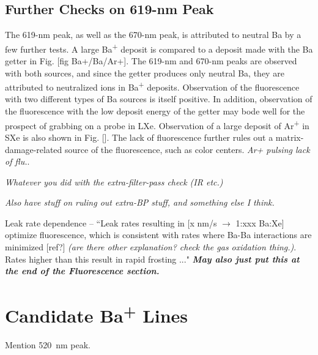 \subsection{Further Checks on 619-nm Peak}
\label{subsec:619identification}

The 619-nm peak, as well as the 670-nm peak, is attributed to neutral Ba by a few further tests.  A large Ba\textsuperscript{+} deposit is compared to a deposit made with the Ba getter in Fig. [fig Ba+/Ba/Ar+].  The 619-nm and 670-nm peaks are observed with both sources, and since the getter produces only neutral Ba, they are attributed to neutralized ions in Ba\textsuperscript{+} deposits.  Observation of the fluorescence with two different types of Ba sources is itself positive.  In addition, observation of the fluorescence with the low deposit energy of the getter may bode well for the prospect of grabbing on a probe in LXe.  Observation of a large deposit of Ar\textsuperscript{+} in SXe is also shown in Fig. [].  The lack of fluorescence further rules out a matrix-damage-related source of the fluorescence, such as color centers.  \emph{\color{gray}Ar+ pulsing lack of flu.}.

\emph{\color{gray}Whatever you did with the extra-filter-pass check (IR etc.)}

\emph{\color{gray}Also have stuff on ruling out extra-BP stuff, and something else I think.}

Leak rate dependence -- ``Leak rates resulting in [x nm/s $\rightarrow$ 1:xxx Ba:Xe] optimize fluorescence, which is consistent with rates where Ba-Ba interactions are minimized [ref?] \emph{\color{gray}(are there other explanation?  check the gas oxidation thing.)}.  Rates higher than this result in rapid frosting ..." \emph{\textbf{\color{gray}May also just put this at the end of the  Fluorescence section.}}

\section{Candidate Ba\textsuperscript{+} Lines}
\label{sec:BaPlus}

Mention 520~nm peak.